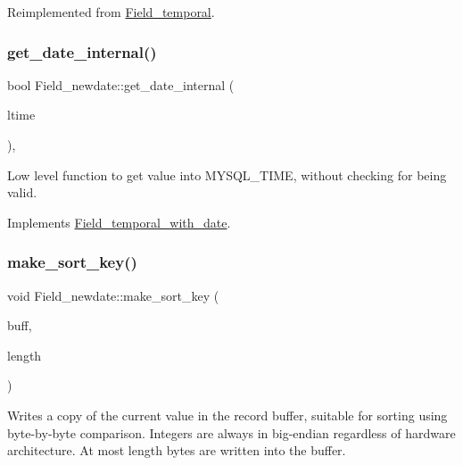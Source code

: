 Reimplemented from \mbox{\hyperlink{classField__temporal_ac97041d80803a32c6fb9250bfa0c9200}{Field\+\_\+temporal}}.

\mbox{\label{classField__newdate_a108e583a4ec9f51e7f1a28d179b3b725}} 
\subsubsection{\texorpdfstring{get\+\_\+date\+\_\+internal()}{get\_date\_internal()}}
{\footnotesize\ttfamily bool Field\+\_\+newdate\+::get\+\_\+date\+\_\+internal (\begin{DoxyParamCaption}\item[{M\+Y\+S\+Q\+L\+\_\+\+T\+I\+ME $\ast$}]{ltime }\end{DoxyParamCaption})\hspace{0.3cm}{\ttfamily [protected]}, {\ttfamily [virtual]}}

Low level function to get value into M\+Y\+S\+Q\+L\+\_\+\+T\+I\+ME, without checking for being valid. 

Implements \mbox{\hyperlink{classField__temporal__with__date_aef905f77b5430dd2b3ef461ce916b4ef}{Field\+\_\+temporal\+\_\+with\+\_\+date}}.

\mbox{\label{classField__newdate_ab9ddf960c38a9d02e2eb3bda37b572e1}} 
\subsubsection{\texorpdfstring{make\+\_\+sort\+\_\+key()}{make\_sort\_key()}}
{\footnotesize\ttfamily void Field\+\_\+newdate\+::make\+\_\+sort\+\_\+key (\begin{DoxyParamCaption}\item[{uchar $\ast$}]{buff,  }\item[{size\+\_\+t}]{length }\end{DoxyParamCaption})\hspace{0.3cm}{\ttfamily [virtual]}}

Writes a copy of the current value in the record buffer, suitable for sorting using byte-\/by-\/byte comparison. Integers are always in big-\/endian regardless of hardware architecture. At most length bytes are written into the buffer.


